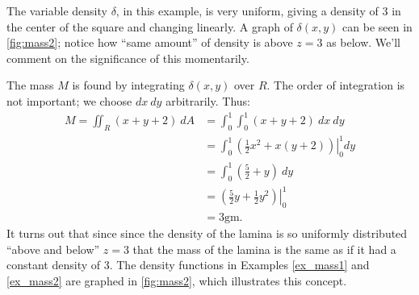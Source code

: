 {The variable density $\delta$, in this example, is very uniform, giving a density of 3 in the center of the square and changing linearly. A graph of $\delta(x,y)$ can be seen in \autoref{fig:mass2}; notice how ``same amount'' of density is above $z=3$ as below. We'll comment on the significance of this momentarily.

The mass $M$ is found by integrating $\delta(x,y)$ over $R$. The order of integration is not important; we choose $dx\ dy$ arbitrarily. Thus:
\begin{align*}
M = \iint_R(x+y+2)\ dA &= \int_0^1\int_0^1 (x+y+2)\ dx\ dy\\
		&= \int_0^1\left.\left(\frac 12x^2+x(y+2)\right)\right|_0^1dy\\
		&= \int_0^1 \left(\frac52+y\right)\ dy\\
		&= \left.\left(\frac52y+\frac12y^2\right)\right|_0^1\\
		&= 3\text{gm}.
\end{align*}
It turns out that since since the density of the lamina is so uniformly distributed ``above and below'' $z=3$ that the mass of the lamina is the same as if it had a constant density of 3. The density functions in Examples \ref{ex_mass1} and \ref{ex_mass2} are graphed in \autoref{fig:mass2}, which illustrates this concept.}

